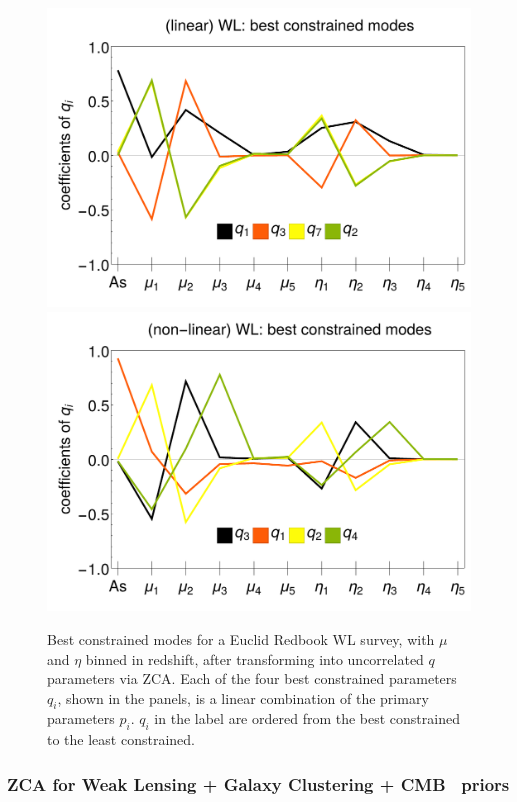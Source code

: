\begin{figure}[htbp]
	\centering{}\includegraphics[width=0.4\linewidth]{Chapters/linear-nonlinear-MG-forecasts/figures/Decorrelations-WL/linear_WL--_best_constrained_modes-Errors_on_q_ZCA_SquareNorm--_fiducialMGBin3_Euclid_WL_linearPK_}
	\includegraphics[width=0.4\linewidth]{Chapters/linear-nonlinear-MG-forecasts/figures/Decorrelations-WL/non-linear_WL--_best_constrained_modes-Errors_on_q_ZCA_SquareNorm--_fiducialMGBin3_Euclid_WL_nonlinearPk__Zhao_}
	\caption[Best constrained modes for Euclid GC applying ZCA.]{\label{fig:WLbestconst}
Best constrained modes for a Euclid Redbook WL survey, 
with $\mu$ and $\eta$ binned in redshift, after transforming into uncorrelated $q$ parameters via ZCA.
Each of the four best constrained parameters $q_i$, shown in the panels, is a linear combination of the primary parameters $p_i$. $q_i$ in the label are ordered from the best constrained to the least constrained.}
\end{figure}





\subsubsection{ZCA for Weak Lensing + Galaxy Clustering +  CMB \planck\ priors}

